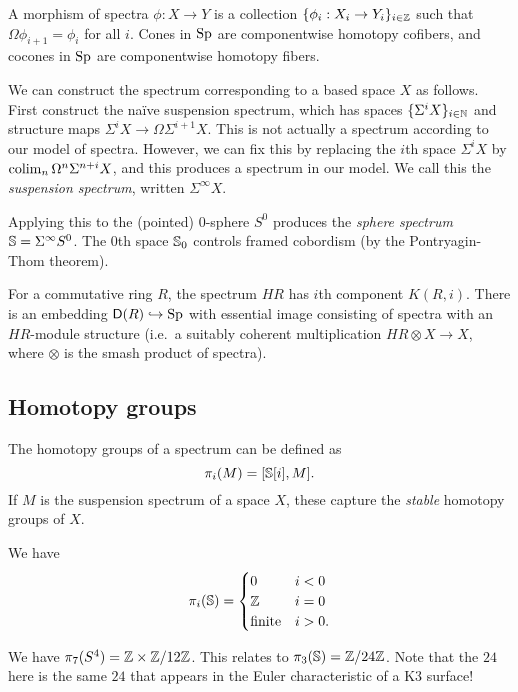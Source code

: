 \documentclass{article}
\begin{document}
A morphism of spectra $\phi: X \to Y$ is a collection $\{ \phi_i: X_i \to Y_i \}_{i \in \mathbb{Z}}$ such that $\Omega \phi_{i+1} = \phi_i$ for all $i$.
Cones in $\operatorname{Sp}$ are componentwise homotopy cofibers, and cocones in $\operatorname{Sp}$ are componentwise homotopy fibers.

We can construct the spectrum corresponding to a based space $X$ as follows.
First construct the na\"ive suspension spectrum, which has spaces $\{ \Sigma^i X \}_{i \in \mathbb{N}}$ and structure maps $\Sigma^i X \to \Omega \Sigma^{i+1} X$.
This is not actually a spectrum according to our model of spectra.
However, we can fix this by replacing the $i$th space $\Sigma^i X$ by $\operatorname{colim}_n \Omega^n \Sigma^{n+i} X$, and this produces a spectrum in our model.
We call this the \emph{suspension spectrum}, written $\Sigma^\infty X$.

\begin{ex}
	Applying this to the (pointed) $0$-sphere $S^0$ produces the \emph{sphere spectrum} $\mathbb{S} = \Sigma^\infty S^0$.
	The $0$th space $\mathbb{S}_0$ controls framed cobordism (by the Pontryagin-Thom theorem).
\end{ex}

\begin{ex}
	For a commutative ring $R$, the spectrum $HR$ has $i$th component $K(R, i)$.
	There is an embedding $\mathsf{D}(R) \hookrightarrow \operatorname{Sp}$ with essential image consisting of spectra with an $HR$-module structure (i.e.\ a suitably coherent multiplication $HR \otimes X \to X$, where $\otimes$ is the smash product of spectra).
\end{ex}

\subsection{Homotopy groups} 

The homotopy groups of a spectrum can be defined as
\[
	\pi_i(M) = [\mathbb{S}[i], M].
\]
If $M$ is the suspension spectrum of a space $X$, these capture the \emph{stable} homotopy groups of $X$.

\begin{thm}[Serre]
	We have
	\[
		\pi_i(\mathbb{S}) = \begin{cases}
			0 & i < 0 \\
			\mathbb{Z} & i = 0 \\
			\textrm{finite} & i > 0.
		\end{cases}
	\]
\end{thm}

\begin{ex}
	We have $\pi_7(S^4) = \mathbb{Z} \times \mathbb{Z} / 12 \mathbb{Z}$.
	This relates to $\pi_3(\mathbb{S}) = \mathbb{Z} / 24 \mathbb{Z}$.
	Note that the $24$ here is the same $24$ that appears in the Euler characteristic of a K3 surface!
\end{ex}
\end{document}
